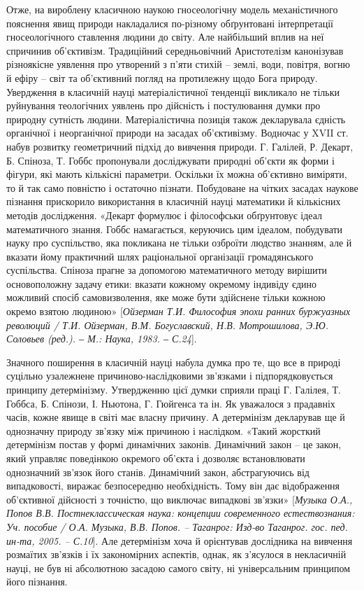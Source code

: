 Отже, на вироблену класичною наукою гносеологічну модель
механістичного пояснення явищ природи накладалися по-різному обґрунтовані
інтерпретації гносеологічного ставлення людини до світу. Але найбільший
вплив на неї спричинив об’єктивізм. Традиційний середньовічний Аристотелізм
канонізував різноякісне уявлення про утворений з п’яти стихій – землі, води,
повітря, вогню й ефіру – світ та об’єктивний погляд на протилежну щодо Бога
природу. Увердження в класичній науці матеріалістичної тенденції викликало
не тільки руйнування теологічних уявлень про дійсність і постулювання думки
про природну сутність людини. Матеріалістична позиція також декларувала
єдність органічної і неорганічної природи на засадах об’єктивізму. Водночас у
XVII ст. набув розвитку геометричний підхід до вивчення природи. Г. Галілей,
Р. Декарт, Б. Спіноза, Т. Гоббс пропонували досліджувати природні об’єкти як
форми і фігури, які мають кількісні параметри. Оскільки їх можна об’єктивно
виміряти, то й так само повністю і остаточно пізнати. Побудоване на чітких
засадах наукове пізнання прискорило використання в класичній науці
математики й кількісних методів дослідження. «Декарт формулює і
філософськи обґрунтовує ідеал математичного знання. Гоббс намагається,
керуючись цим ідеалом, побудувати науку про суспільство, яка покликана не
тільки озброїти людство знанням, але й вказати йому практичний шлях
раціональної організації громадянського суспільства. Спіноза прагне за
допомогою математичного методу вирішити основоположну задачу етики:
вказати кожному окремому індивіду єдино можливий спосіб самовизволення,
яке може бути здійснене тільки кожною окремо взятою людиною» [\textit{Ойзерман
Т.И. Философия эпохи ранних буржуазных революций / Т.И. Ойзерман, В.М.
Богуславский, Н.В. Мотрошилова, Э.Ю. Соловьев (ред.). ‒ М.: Наука, 1983. ‒
С.24}].

Значного поширення в класичній науці набула думка про те, що все в
природі суцільно узалежнене причиново-наслідковими зв’язками і
підпорядковується принципу детермінізму. Утвердженню цієї думки сприяли
праці Г. Галілея, Т. Гоббса, Б. Спінози, І. Ньютона, Г. Гюйгенса та ін. Як
уважалося з прадавніх часів, кожне явище в світі має власну причину. А
детермінізм декларував ще й однозначну природу зв’язку між причиною і
наслідком. «Такий жорсткий детермінізм постав у формі динамічних законів.
Динамічний закон – це закон, який управляє поведінкою окремого об’єкта і
дозволяє встановлювати однозначний зв’язок його станів. Динамічний закон,
абстрагуючись від випадковості, виражає безпосередню необхідність. Тому він
дає відображення об’єктивної дійсності з точністю, що виключає випадкові
зв’язки» [\textit{Музыка О.А., Попов В.В. Постнеклассическая наука: концепции
современного естествознания: Уч. пособие / О.А. Музыка, В.В. Попов. –
Таганрог: Изд-во Таганрог. гос. пед. ин-та, 2005. – С.10}]. Але детермінізм хоча
й орієнтував дослідника на вивчення розмаїтих зв’язків і їх закономірних
аспектів, однак, як з’ясулося в некласичній науці, не був ні абсолютною
засадою самого світу, ні універсальним принципом його пізнання.

